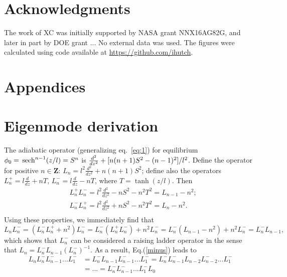 \documentclass[12pt]{article}
\def\sech{{\,\rm sech}}
\begin{document}
\section*{Acknowledgments}
The work of XC was initially supported by NASA grant NNX16AG82G, and
later in part by DOE grant ... No external data was used. The figures were
calculated using code available at \url{https://github.com/ihutch}.


\section*{Appendices}
\appendix
\section{Eigenmode derivation}

The adiabatic operator (generalizing eq.\ \ref{eq:1}) for equilibrium
$\phi_0=\sech^{n-1}(z/l)=S^n$ is
${d^2\over dz^2}+[n(n+1)S^2-(n-1)^2]/l^2$. Define the operator
for positive $n\in \mathbf{Z}$:
$L_n=l^2\frac{d^2}{dz^2}+{n(n+1)} S^2$; define also the operators
$L^+_n=l\frac{d}{dz}+n T$, $L^-_n=l\frac{d}{dz}-n T$, where
$T=\tanh(z/l)$. Then
\begin{equation}
\begin{split}
  &L^+_n L^-_n=l^2\frac{d^2}{dz^2}-n S^2-n^2 T^2
  =L_{n-1}-n^2;\\
  &L^-_n L^+_n=l^2\frac{d^2}{dz^2}+n S^2-n^2 T^2
  =L_n-n^2.\\
\end{split}
\end{equation}
Using these properties, we immediately find that
   \begin{equation}
     L_n L^-_n=(L^-_n L^+_n+n^2)L^-_n=L^-_n (L^+_n
     L^-_n)+n^2L^-_n=L^-_n (L_{n-1}-n^2)+n^2 L^-_n=L^-_n L_{n-1},
     \label{minus}
   \end{equation}
which shows that $L^-_n$ can be considered a raising ladder operator
in the sense that $L_n=L^-_nL_{n-1}(L^-_n)^{-1}$.   
As a result, Eq.(\ref{minus}) leads to
\begin{equation}
  \begin{split}
  L_n L_n ^- L_{n-1}^- ... L_1^-&=L^-_n L_{n-1}L_{n-1}^-
  ... L_1^-=L^-_n L_{n-1}^- L_{n-2}L_{n-2}^- ... L_1^-\\
  & = ...= L_n ^-L_{n-1}^- ... L_1^- L_0
  \end{split}
  \label{nu}
\end{equation}
\end{document}
